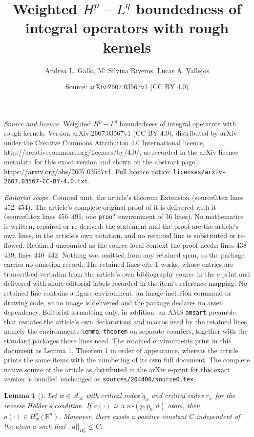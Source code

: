 \documentclass[10pt,a4paper]{amsart}
\title{Weighted $H^p\!- \! L^q$ boundedness of integral operators with rough kernels}
\author{Andrea L. Gallo, M. Silvina Riveros, Lucas A. Vallejos}
\date{Source: arXiv:2607.03567v1 (CC BY 4.0)}
\newtheorem{lemma}{Lemma}
\begin{document}
\maketitle

\noindent\emph{Source and licence.} Weighted $H^p\!- \! L^q$ boundedness of integral operators with rough kernels. Version arXiv:2607.03567v1 (CC BY 4.0), distributed by arXiv under the Creative Commons Attribution 4.0 International licence, http://creativecommons.org/licenses/by/4.0/, as recorded in the arXiv licence metadata for this exact version and shown on the abstract page https://arxiv.org/abs/2607.03567v1. Full licence notice: \texttt{licenses/arxiv-2607.03567-CC-BY-4.0.txt}.\par\smallskip

\noindent\textit{Editorial scope.} Counted unit: the article's theorem Extension (source0.tex lines 452--454). The article's complete original proof of it is delivered with it (source0.tex lines 456--491, one \texttt{proof} environment of 36 lines). No mathematics is written, repaired or re-derived: the statement and the proof are the article's own lines, in the article's own notation, and no retained line is substituted or re-flowed.  Retained uncounted as the source-local context the proof needs: lines 438--439; lines 440--442.  Nothing was omitted from any retained span, so the package carries no omission record.  The retained lines cite 1 works, whose entries are transcribed verbatim from the article's own bibliography source in the e-print and delivered with short editorial labels recorded in the item's reference mapping.  No retained line contains a figure environment, an image-inclusion command or drawing code, so no image is delivered and the package declares no asset dependency.  Editorial formatting only, in addition: an AMS \texttt{amsart} preamble that restates the article's own declarations and macros used by the retained lines, namely the environments \texttt{lemma}, \texttt{theorem} on separate counters, together with the standard packages those lines need.  The retained environments print in this document as Lemma 1, Theorem 1 in order of appearance, whereas the article prints the same items with the numbering of its own full document.  The complete native source of the article as distributed in the arXiv e-print for this exact version is bundled unchanged as \texttt{sources/204400/source0.tex}.
	\begin{lemma}[\cite{Rocha}]\label{Lemma8} Let $w \in \mathcal{A}_{\infty}$ with critical index $\tilde{q}_w$ and critical index $r_w$ for the reverse H\"{o}lder's condition. If $a(\cdot)$ is a $w$-$(p,p_0,d)$ atom, then $a(\cdot) \in H^{p}_w(\mathbb{R}^{n})$. Moreover, there exists a positive constant $C$ independent of the atom $a$ such that $||a||_{H^{p}_w} \leq C$. 
	\end{lemma}
\end{document}
